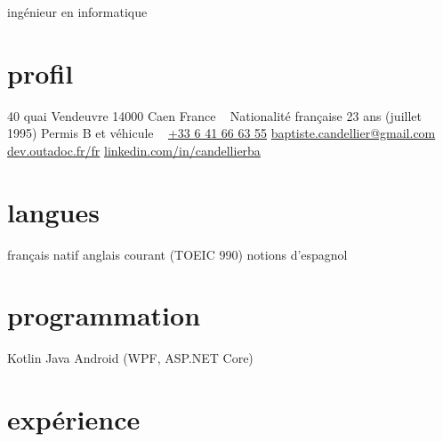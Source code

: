 \documentclass[]{friggeri-cv}
\begin{document}
{ingénieur en informatique}

\begin{aside}
    \section{profil}
    40 quai Vendeuvre
    14000 Caen
    France
    ~
    Nationalité française
    23 ans (juillet 1995)
    Permis B et véhicule
    ~
    \href{tel:0033641666355}{+33 6 41 66 63 55}
    \href{mailto:baptiste.candellier@gmail.com}{baptiste.candellier@gmail.com}
    ~
    {\NoAutoSpacing\href{https://dev.outadoc.fr/fr}{dev.outadoc.fr/fr}}
    {\NoAutoSpacing\href{https://www.linkedin.com/in/candellierba/}{linkedin.com/in/candellierba}}
    \section{langues}
    français natif
    anglais courant (TOEIC 990)
    notions d'espagnol
    \section{programmation}
    Kotlin
    Java
    Android
    \csharp{} (WPF, ASP.NET Core)
    \restorecr 
    \obeycr
\end{aside}

\section{expérience}
\end{document}
